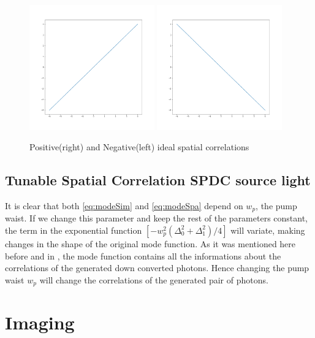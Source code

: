 \begin{figure}[h!]
\centering
{  \includegraphics[width=0.48\textwidth]{Figures/idealPositiveCorrelation.png} }
{  \includegraphics[width=0.48\textwidth]{Figures/idealNegativeCorrelation.png} }
\caption{Positive(right) and Negative(left) ideal spatial correlations}
 \label{fig:idealCorre}
\end{figure}


\subsection{Tunable Spatial Correlation SPDC source light}
It is clear that both \ref{eq:modeSim} and \ref{eq:modeSpa} depend on $w_p$, the pump waist. If we change this 
parameter and keep the rest of the parameters constant, the term in the exponential function $[-w_p^2 (\Delta_0^2 + \Delta_1^2 )/4]$ will variate,
making changes in the shape of the original mode function. As it was mentioned here before and in \cite{omar}, the mode function
contains all the informations about the correlations of the generated down converted photons. Hence changing the pump waist $w_p$
will change the correlations of the generated pair of photons.




\section{Imaging}

